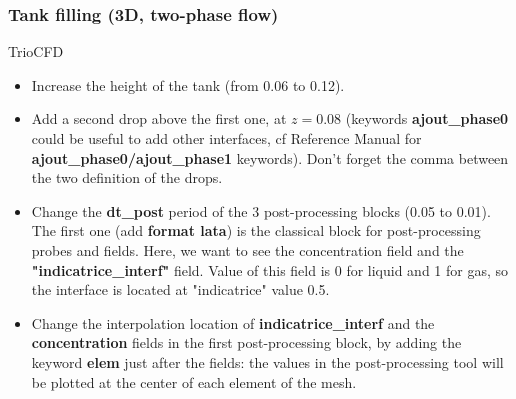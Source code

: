 \documentclass[10pt, hyperref={unicode=true,pdfusetitle, bookmarks=true,bookmarksnumbered=false,bookmarksopen=false, breaklinks=false,pdfborder={0 0 1},backref=true,colorlinks=true,linkcolor=darkblue,pageanchor}]{beamer}
\begin{document}
\begin{frame}
\frametitle{Tank filling (3D, two-phase flow)}
\begin{block}{TrioCFD}

\begin{itemize}
\item Increase the height of the tank (from 0.06 to 0.12).

\item Add a second drop above the first one, at $z=0.08$ (keywords \textbf{ajout\_phase0} could be useful to add other interfaces, cf Reference Manual for \textbf{ajout\_phase0/ajout\_phase1} keywords). Don't forget the comma between the two definition of the drops.

\item Change the \textbf{dt\_post} period of the 3 post-processing blocks (0.05 to 0.01). The first one (add \textbf{format lata}) is the classical block for post-processing probes and fields. Here, we want to see the concentration field and the \textbf{"indicatrice\_interf"} field. Value of this field is 0 for liquid and 1 for gas, so the interface is located at "indicatrice" value 0.5.

\item Change the interpolation location of \textbf{indicatrice\_interf} and the \textbf{concentration} fields in the first post-processing block, by adding the keyword \textbf{elem} just after the fields: the values in the post-processing tool will be plotted at the center of each element of the mesh.
\end{itemize}

\end{block}
\end{frame}
\end{document}
